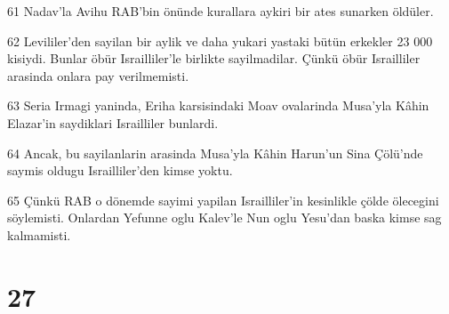 \par 61 Nadav'la Avihu RAB'bin önünde kurallara aykiri bir ates sunarken öldüler.
\par 62 Levililer'den sayilan bir aylik ve daha yukari yastaki bütün erkekler 23 000 kisiydi. Bunlar öbür Israilliler'le birlikte sayilmadilar. Çünkü öbür Israilliler arasinda onlara pay verilmemisti.
\par 63 Seria Irmagi yaninda, Eriha karsisindaki Moav ovalarinda Musa'yla Kâhin Elazar'in saydiklari Israilliler bunlardi.
\par 64 Ancak, bu sayilanlarin arasinda Musa'yla Kâhin Harun'un Sina Çölü'nde saymis oldugu Israilliler'den kimse yoktu.
\par 65 Çünkü RAB o dönemde sayimi yapilan Israilliler'in kesinlikle çölde ölecegini söylemisti. Onlardan Yefunne oglu Kalev'le Nun oglu Yesu'dan baska kimse sag kalmamisti.

\chapter{27}

